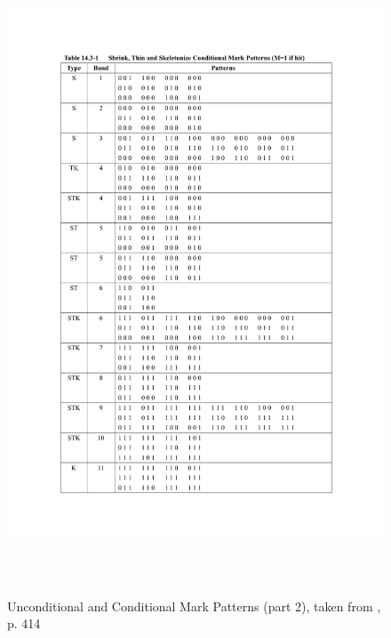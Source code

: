 \documentclass{article}
\begin{document}
\begin{figure}
 \includegraphics[page=2,height=19cm]{images/patternTables.pdf}
 \caption{Unconditional and Conditional Mark Patterns (part 2), taken from \cite{Pratt:2001:DIP:516234}, p. 414}
 \label{fig:markpatterns2}
\end{figure}
\end{document}
